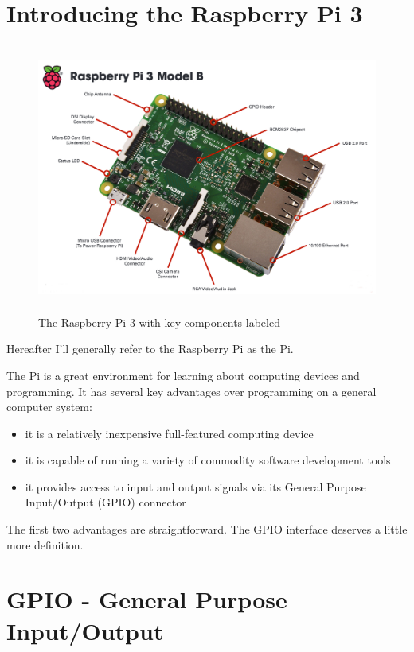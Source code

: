 \section{Introducing the Raspberry Pi 3}

\begin{figure}[H]
	\centering
	\includegraphics[height=3.50in]{pi_images/Raspi-3-Layout.jpg}
	\caption{The Raspberry Pi 3 with key components labeled}
	\label{fig:raspberrypi3}
\end{figure}

Hereafter I'll generally refer to the Raspberry Pi as the Pi.

The Pi is a great environment for learning about computing devices and programming. It has several key 
advantages over programming on a general computer system:

\begin{itemize}
	\item it is a relatively inexpensive full-featured computing device
	\item it is capable of running a variety of commodity software development tools
	\item it provides access to input and output signals via its General Purpose Input/Output (GPIO) connector
\end{itemize}

The first two advantages are straightforward. The GPIO interface deserves a little more definition.

\section{GPIO - General Purpose Input/Output}

